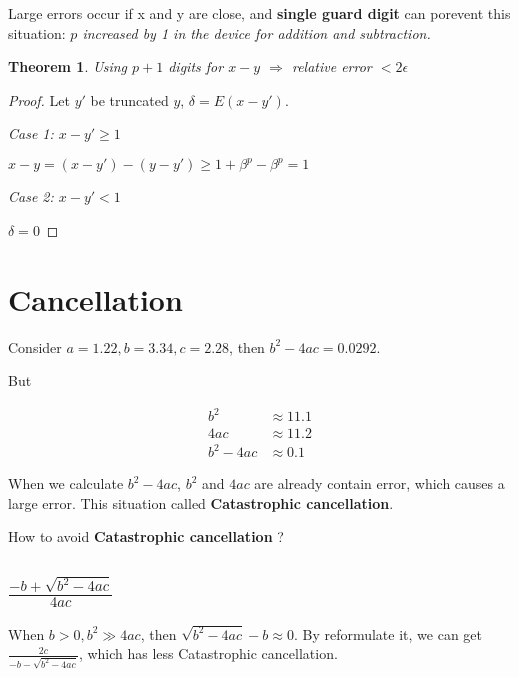\documentclass{article}
\newtheorem{theorem}{Theorem}
\begin{document}
        Large errors occur if x and y are close, and \textbf{single guard digit}
        can porevent this situation:
        {\it $p$ increased by 1 in the device for addition and subtraction.}

        
        \begin{theorem}
            Using $p+1$ digits for $x-y$ $\Rightarrow$ relative error $ < 2\epsilon$
        \end{theorem}

        \begin{proof}
            Let $y'$ be truncated $y$, $\delta = E(x - y')$.

            \emph{Case 1: $x - y' \geq 1$}

                $x - y = (x - y') - (y - y') \geq 1 + \beta^p - \beta^p = 1$

            \emph{Case 2: $x - y' < 1$}

                $\delta = 0$

        \end{proof}

        \section{Cancellation}

        Consider $a = 1.22, b = 3.34, c = 2.28$, then $b^2 - 4ac = 0.0292$.

        But
        
        \begin{align}
            b^2       &\approx 11.1 \nonumber \\
            4ac       &\approx 11.2 \nonumber \\
            b^2 - 4ac &\approx  0.1 \nonumber
        \end{align}

        When we calculate $b^2 - 4ac$, $b^2$ and $4ac$ are already contain error,
        which causes a large error. This situation called \textbf{Catastrophic cancellation}.

        How to avoid \textbf{Catastrophic cancellation} ?

        \subsection{$\frac{-b + \sqrt{b^2 - 4ac}}{4ac}$}

        When $b > 0, b^2 \gg 4ac$, then $\sqrt{b^2 - 4ac} - b \approx 0$.
        By reformulate it, we can get $\frac{2c}{- b - \sqrt{b^2 - 4ac}}$,
        which has less Catastrophic cancellation.
\end{document}
